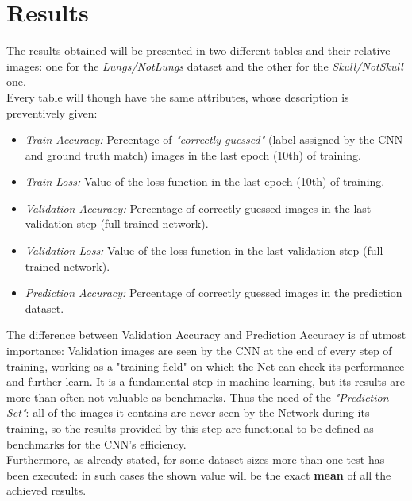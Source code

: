 \documentclass[../main.tex]{subfiles}
\begin{document}
\section{Results}
The results obtained will be presented in two different tables and their relative images: one for the \textit{Lungs/NotLungs} dataset and the other for the \textit{Skull/NotSkull} one.  \\
Every table will though have the same attributes, whose description is preventively given:

\begin{itemize}
	\item \textit{Train Accuracy:} Percentage of \textit{"correctly guessed"} (label assigned by the CNN and ground truth match) images in the last epoch (10th) of training.
	\item \textit{Train Loss:} Value of the loss function in the last epoch (10th) of training.
	\item \textit{Validation Accuracy:} Percentage of correctly guessed images in the last validation step (full trained network).
	\item \textit{Validation Loss:} Value of the loss function in the last validation step (full trained network).
	\item \textit{Prediction Accuracy:} Percentage of correctly guessed images in the prediction dataset.
\end{itemize}

The difference between Validation Accuracy and Prediction Accuracy is of utmost importance: Validation images are seen by the CNN at the end of every step of training, working as a "training field" on which the Net can check its performance and further learn. It is a fundamental step in machine learning, but its results are more than often not valuable as benchmarks. Thus the need of the \textit{"Prediction Set"}: all of the images it contains are never seen by the Network during its training, so the results provided by this step are functional to be defined as benchmarks for the CNN's efficiency.  \\
Furthermore, as already stated, for some dataset sizes more than one test has been executed: in such cases the shown value will be the exact \textbf{mean} of all the achieved results.
\clearpage
\newpage 
\end{document}
